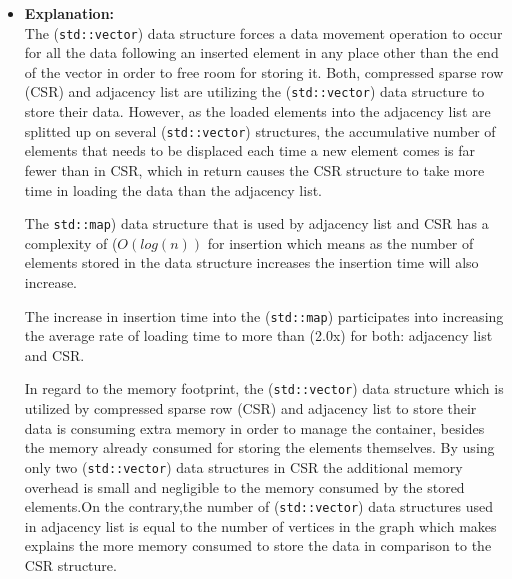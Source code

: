 {\begin{itemize}
In (\ref{fig:Scalability-Topology}), we show two graphs depicting the scalability of adjacency list and compressed sparse row in terms of loading time and memory footprint. In (Figure \ref{fig:Scalability-Topology-Loading}), we show a chart with the change in the loading time of each scale factor of the evaluation dataset into the adjacency list and the compressed sparse row (CSR). In (Figure \ref{fig:Scalability-Topology-Memory}), we show a chart with the change in the memory footprint of each scale factor of the evaluation dataset into the adjacency list and the compressed sparse row (CSR). In (\ref{tbl-EvalResults-Scal-Topology}), we present a table containing the exact figures we recorded for each of the scalability experiments we executed on the adjacency list, the compressed sparse row (CSR), and the adjacency matrix.

\item \textbf{Explanation:}\\
The (\texttt{std::vector}) data structure forces a data movement operation to occur for all the data following an inserted element in any place other than the end of the vector in order to free room for storing it. Both, compressed sparse row (CSR) and adjacency list are utilizing the (\texttt{std::vector}) data structure to store their data. However, as the loaded elements into the adjacency list are splitted up on several (\texttt{std::vector}) structures, the accumulative number of elements that needs to be displaced each time a new element comes is far fewer than in CSR, which in return causes the CSR structure to take more time in loading the data than the adjacency list. 

The \texttt{std::map}) data structure that is used by adjacency list and CSR has a complexity of ($O(log(n))$ for insertion which means as the number of elements stored in the data structure increases the insertion time will also increase. 

The increase in insertion time into the (\texttt{std::map}) participates into increasing the average rate of loading time to more than (2.0x) for both: adjacency list and CSR.

In regard to the memory footprint, the (\texttt{std::vector}) data structure which is utilized by compressed sparse row (CSR) and adjacency list to store their data is consuming extra memory in order to manage the container, besides the memory already consumed for storing the elements themselves. By using only two (\texttt{std::vector}) data structures in CSR the additional memory overhead is small and negligible to the memory consumed by the stored elements.On the contrary,the number of (\texttt{std::vector}) data structures used in adjacency list is equal to the number of vertices in the graph which makes explains the more memory consumed to store the data in comparison to the CSR structure.


\end{itemize}}
